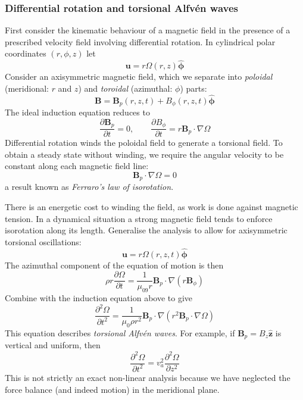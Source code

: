 \documentclass{jknotes}
\newcommand{\B}{\symbf{B}}
\renewcommand{\u}{\symbf{u}}
\begin{document}
\subsubsection{Differential rotation and torsional Alfv\'{e}n waves}
First consider the kinematic behaviour of a magnetic field in the presence of
a prescribed velocity field involving differential rotation. In cylindrical
polar coordinates $(r,\phi,z)$ let 
\begin{equation}
	\u = r \Omega(r,z) \hat{\symbf{\phi}}
\end{equation}
Consider an axisymmetric magnetic field, which we separate into
\emph{poloidal} (meridional: $r$ and $z$) and \emph{toroidal} (azimuthal:
$\phi$) parts:
\begin{equation}
	\B = \B_p(r,z,t) + B_\phi(r,z,t) \hat{\symbf{\phi}}
\end{equation}
The ideal induction equation reduces to
\begin{equation}
	\frac{\partial \B_p}{\partial t} = 0, \hspace{2em} \frac{\partial
	B_\phi}{\partial t} = r \B_p \cdot \nabla \Omega
\end{equation}
Differential rotation winds the poloidal field to generate a torsional field.
To obtain a steady state without winding, we require the angular velocity to
be constant along each magnetic field line:
\begin{equation}
	\B_p \cdot \nabla \Omega = 0
\end{equation}
a result known as \emph{Ferraro's law of isorotation}. 

There is an energetic cost to winding the field, as work is done against
magnetic tension. In a dynamical situation a strong magnetic field tends to
enforce isorotation along its length. Generalise the analysis to allow for
axisymmetric torsional oscillations:
\begin{equation}
	\u = r \Omega(r,z,t) \hat{\symbf{\phi}}
\end{equation}
The azimuthal component of the equation of motion is then
\begin{equation}
	\rho r \frac{\partial \Omega}{\partial t} = \frac{1}{\mu_09 r} \B_p \cdot
	\nabla( r \B_\phi)
\end{equation}
Combine with the induction equation above to give
\begin{equation}
	\frac{\partial^2 \Omega}{\partial t^2} = \frac{1}{\mu_0 \rho r^2} \B_p
	\cdot \nabla (r^2 \B_p \cdot \nabla \Omega)
\end{equation}
This equation describes \emph{torsional Alfv\'{e}n waves}. For example, if
$\B_p = B_z \hat{\symbf{z}}$ is vertical and uniform, then
\begin{equation}
	\frac{\partial^2 \Omega}{\partial t^2} = v_a^2 \frac{\partial^2
	\Omega}{\partial z^2}
\end{equation}
This is not strictly an exact non-linear analysis because we have neglected
the force balance (and indeed motion) in the meridional plane.
\end{document}

